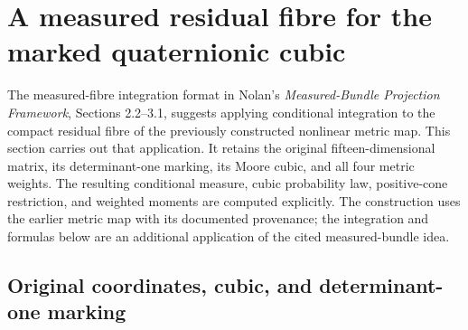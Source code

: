 \section{A measured residual fibre for the marked quaternionic cubic}
\label{sec:residual-measure}

The measured-fibre integration format in Nolan's \emph{Measured-Bundle
Projection Framework}, Sections 2.2--3.1,
\cite{Nolan2025Threads,NolanRepository2025MBPF} suggests applying conditional
integration to the compact residual fibre of the previously constructed
nonlinear metric map. This section carries out that application. It retains
the original fifteen-dimensional matrix, its determinant-one marking, its
Moore cubic, and all four metric weights. The resulting conditional measure,
cubic probability law, positive-cone restriction, and weighted moments are
computed explicitly. The construction uses the earlier metric map with its
documented provenance; the integration and formulas below are an additional
application of the cited measured-bundle idea.

\subsection{Original coordinates, cubic, and determinant-one marking}

